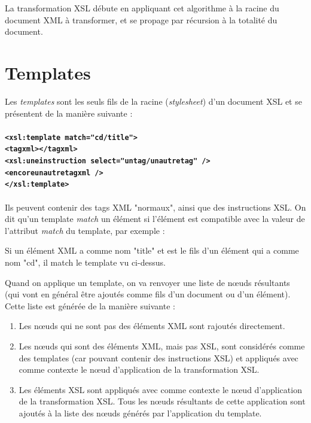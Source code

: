 La transformation XSL débute en appliquant cet algorithme à la racine du document XML à transformer, et se propage par récursion à la totalité du document.


\section{Templates}

Les \textit{templates} sont les seuls fils de la racine (\textit{stylesheet}) d'un document XSL et se présentent de la manière suivante :
\\
\\
\textbf{
\lstinline$<xsl:template match="cd/title">$\\
\indent \lstinline$<tagxml></tagxml>$\\
\indent \lstinline$<xsl:uneinstruction select="untag/unautretag" />$\\
\indent \lstinline$<encoreunautretagxml />$\\
\lstinline$</xsl:template>$
}
\\
\\
Ils peuvent contenir des tags XML "normaux", ainsi que des instructions XSL.
On dit qu'un template \textit{match} un élément si l'élément est compatible avec la valeur de l'attribut \textit{match} du template, par exemple :

Si un élément XML a comme nom "title" et est le fils d'un élément qui a comme nom "cd", il match le template vu ci-dessus.

Quand on applique un template, on va renvoyer une liste de nœuds résultants (qui vont en général être ajoutés comme fils d'un document ou d'un élément). Cette liste est générée de la manière suivante :\\

\begin{enumerate}
    \item Les nœuds qui ne sont pas des éléments XML sont rajoutés directement.
    \item Les nœuds qui sont des éléments XML, mais pas XSL, sont considérés comme des templates (car pouvant contenir des instructions XSL) et appliqués avec comme contexte le nœud d'application de la transformation XSL.
    \item Les éléments XSL sont appliqués avec comme contexte le nœud d'application de la transformation XSL. Tous les nœuds résultants de cette application sont ajoutés à la liste des nœuds générés par l'application du template.

\end{enumerate}